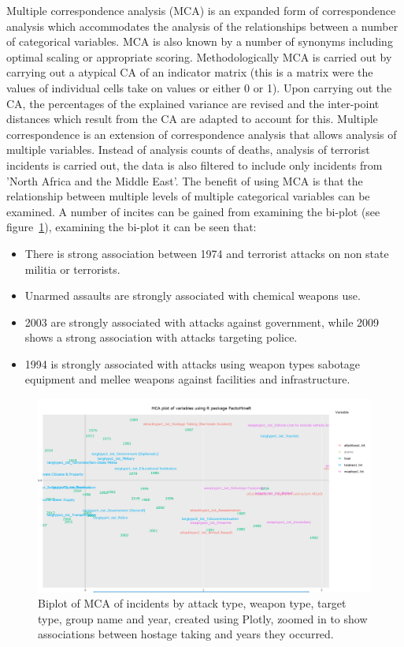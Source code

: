Multiple correspondence analysis (MCA) is an expanded form of correspondence analysis which accommodates the analysis of the relationships between a number of categorical variables. MCA is also known by a number of synonyms including  optimal scaling  or appropriate scoring. Methodologically MCA is carried out by carrying out a atypical CA of an indicator matrix (this is a matrix were the values of individual cells take on values or either 0 or 1). Upon carrying out the CA, the percentages of the explained variance are revised and the inter-point distances which result from the CA are adapted to account for this. Multiple correspondence is an extension of correspondence analysis that allows analysis of multiple variables. Instead of analysis counts of deaths, analysis of terrorist incidents is carried out, the data is also filtered to include only incidents from 'North Africa and the Middle East'. The benefit of using MCA is that the relationship between multiple levels of multiple categorical variables can be examined. A number of incites can be gained from examining the bi-plot (see figure~\ref{fig:biplotmca}), examining the bi-plot it can be seen that:
\begin{itemize}
\item  There is strong association between 1974 and terrorist attacks on non state militia or terrorists.
\item Unarmed assaults are strongly associated with chemical weapons use.
\item 2003 are strongly associated with attacks against government, while 2009 shows a strong association with attacks targeting police.  
\item 1994 is strongly associated with attacks using weapon types sabotage equipment and mellee weapons against facilities and infrastructure.
\end{itemize}

\begin{figure}[t]
\includegraphics[width=15cm]{Peters_experiment_markdown_files/figure-latex/newplot3.png}
\caption{Biplot of MCA of incidents by attack type, weapon type, target type, group name and year, created using Plotly, zoomed in to show associations between hostage taking and years they occurred.}
\label{fig:biplotmca}
\centering
\end{figure}

